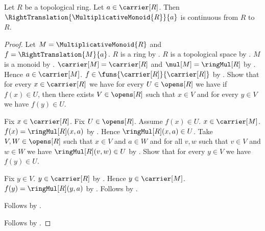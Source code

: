 \begin{theorem}\label{topological_ring_right_multiplication_continuous}
    Let $R$ be a topological ring.
    Let $a\in\carrier[R]$.
    Then $\RightTranslation{\MultiplicativeMonoid{R}}{a}$ is continuous
        from $R$ to $R$.
\end{theorem}
\begin{proof}
    Let $M=\MultiplicativeMonoid{R}$ and
        $f=\RightTranslation{M}{a}$.
    $R$ is a ring by .
    $R$ is a topological space by
        .
    $M$ is a monoid by .
    $\carrier[M]=\carrier[R]$ and $\mul[M]=\ringMul[R]$
        by .
    Hence $a\in\carrier[M]$.
    $f\in\funs{\carrier[R]}{\carrier[R]}$ by
        .
    Show that for every $x\in\carrier[R]$ we have
        for every $U\in\opens[R]$ we have if $f(x)\in U$, then there exists
            $V\in\opens[R]$ such that $x\in V$ and
            for every $y\in V$ we have $f(y)\in U$.
    \begin{subproof}
        Fix $x\in\carrier[R]$.
        Fix $U\in\opens[R]$.
        Assume $f(x)\in U$.
        $x\in\carrier[M]$.
        $f(x)=\ringMul[R](x,a)$ by
            .
        Hence $\ringMul[R](x,a)\in U$.
        Take $V,W\in\opens[R]$ such that $x\in V$ and $a\in W$ and
            for all $v,w$ such that $v\in V$ and $w\in W$ we have
                $\ringMul[R](v,w)\in U$
            by .
        Show that for every $y\in V$ we have $f(y)\in U$.
        \begin{subproof}
            Fix $y\in V$.
            $y\in\carrier[R]$ by
                .
            Hence $y\in\carrier[M]$.
            $f(y)=\ringMul[R](y,a)$ by
                .
            Follows by \auto.
        \end{subproof}
        Follows by \auto.
    \end{subproof}
    Follows by .
\end{proof}

